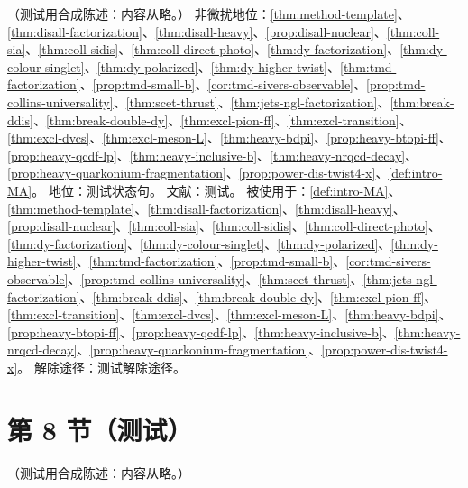\begin{assumption}\label{asm:intro-bridge}
（测试用合成陈述：内容从略。）
非微扰地位：\cref{thm:method-template}、\cref{thm:disall-factorization}、\cref{thm:disall-heavy}、\cref{prop:disall-nuclear}、\cref{thm:coll-sia}、\cref{thm:coll-sidis}、\cref{thm:coll-direct-photo}、\cref{thm:dy-factorization}、\cref{thm:dy-colour-singlet}、\cref{thm:dy-polarized}、\cref{thm:dy-higher-twist}、\cref{thm:tmd-factorization}、\cref{prop:tmd-small-b}、\cref{cor:tmd-sivers-observable}、\cref{prop:tmd-collins-universality}、\cref{thm:scet-thrust}、\cref{thm:jets-ngl-factorization}、\cref{thm:break-ddis}、\cref{thm:break-double-dy}、\cref{thm:excl-pion-ff}、\cref{thm:excl-transition}、\cref{thm:excl-dvcs}、\cref{thm:excl-meson-L}、\cref{thm:heavy-bdpi}、\cref{prop:heavy-btopi-ff}、\cref{prop:heavy-qcdf-lp}、\cref{thm:heavy-inclusive-b}、\cref{thm:heavy-nrqcd-decay}、\cref{prop:heavy-quarkonium-fragmentation}、\cref{prop:power-dis-twist4-x}、\cref{def:intro-MA}。
地位：测试状态句。
文献：测试。
被使用于：\cref{def:intro-MA}、\cref{thm:method-template}、\cref{thm:disall-factorization}、\cref{thm:disall-heavy}、\cref{prop:disall-nuclear}、\cref{thm:coll-sia}、\cref{thm:coll-sidis}、\cref{thm:coll-direct-photo}、\cref{thm:dy-factorization}、\cref{thm:dy-colour-singlet}、\cref{thm:dy-polarized}、\cref{thm:dy-higher-twist}、\cref{thm:tmd-factorization}、\cref{prop:tmd-small-b}、\cref{cor:tmd-sivers-observable}、\cref{prop:tmd-collins-universality}、\cref{thm:scet-thrust}、\cref{thm:jets-ngl-factorization}、\cref{thm:break-ddis}、\cref{thm:break-double-dy}、\cref{thm:excl-pion-ff}、\cref{thm:excl-transition}、\cref{thm:excl-dvcs}、\cref{thm:excl-meson-L}、\cref{thm:heavy-bdpi}、\cref{prop:heavy-btopi-ff}、\cref{prop:heavy-qcdf-lp}、\cref{thm:heavy-inclusive-b}、\cref{thm:heavy-nrqcd-decay}、\cref{prop:heavy-quarkonium-fragmentation}、\cref{prop:power-dis-twist4-x}。
解除途径：测试解除途径。
\end{assumption}

\section{第 8 节（测试）}\label{sec:intro-organisation}

\begin{definition}\label{def:intro-MA}
（测试用合成陈述：内容从略。）
\end{definition}
